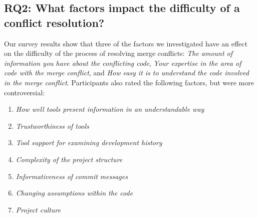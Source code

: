\subsection{RQ2: What factors impact the difficulty of a conflict resolution?}\label{RQ2}


Our survey results show that three of the factors we investigated have an effect on the difficulty of the process of resolving merge conflicts: \textit{The amount of information you have about the conflicting code}, \textit{Your expertise in the area of code with the merge conflict}, and \textit{How easy it is to understand the code involved in the merge conflict}. 
Participants also rated the following factors, but were more controversial:
\begin{enumerate}
	\item \textit{How well tools present information in an understandable way}
	\item \textit{Trustworthiness of tools}
	\item \textit{Tool support for examining development history}
	\item \textit{Complexity of the project structure}
	\item \textit{Informativeness of commit messages}
	\item \textit{Changing assumptions within the code}
	\item \textit{Project culture}
\end{enumerate}